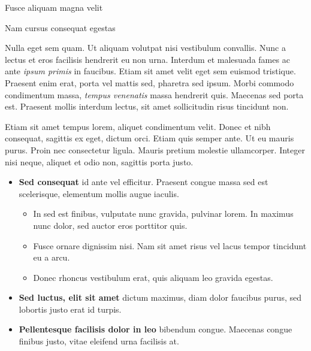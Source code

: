 \documentclass[final]{beamer}
\newlength{\colwidth}
\begin{document}
\begin{frame}[t]
\begin{columns}[t]
\begin{column}{\colwidth}
\begin{block}{Fusce aliquam magna velit}
  \end{block}

  \begin{block}{Nam cursus consequat egestas}

    Nulla eget sem quam. Ut aliquam volutpat nisi vestibulum convallis. Nunc a
    lectus et eros facilisis hendrerit eu non urna. Interdum et malesuada fames
    ac ante \textit{ipsum primis} in faucibus. Etiam sit amet velit eget sem
    euismod tristique. Praesent enim erat, porta vel mattis sed, pharetra sed
    ipsum. Morbi commodo condimentum massa, \textit{tempus venenatis} massa
    hendrerit quis. Maecenas sed porta est. Praesent mollis interdum lectus,
    sit amet sollicitudin risus tincidunt non.

    Etiam sit amet tempus lorem, aliquet condimentum velit. Donec et nibh
    consequat, sagittis ex eget, dictum orci. Etiam quis semper ante. Ut eu
    mauris purus. Proin nec consectetur ligula. Mauris pretium molestie
    ullamcorper. Integer nisi neque, aliquet et odio non, sagittis porta justo.

    \begin{itemize}
      \item \textbf{Sed consequat} id ante vel efficitur. Praesent congue massa
        sed est scelerisque, elementum mollis augue iaculis.
        \begin{itemize}
          \item In sed est finibus, vulputate
            nunc gravida, pulvinar lorem. In maximus nunc dolor, sed auctor eros
            porttitor quis.
          \item Fusce ornare dignissim nisi. Nam sit amet risus vel lacus
            tempor tincidunt eu a arcu.
          \item Donec rhoncus vestibulum erat, quis aliquam leo
            gravida egestas.
        \end{itemize}
      \item \textbf{Sed luctus, elit sit amet} dictum maximus, diam dolor
        faucibus purus, sed lobortis justo erat id turpis.
      \item \textbf{Pellentesque facilisis dolor in leo} bibendum congue.
        Maecenas congue finibus justo, vitae eleifend urna facilisis at.
    \end{itemize}

  \end{block}

\end{column}


\end{columns}
\end{frame}
\end{document}
